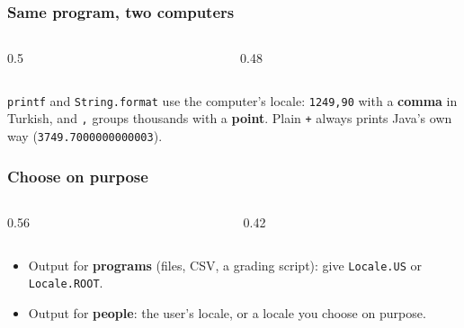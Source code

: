 \documentclass[aspectratio=169,10pt,compress]{beamer}
\begin{document}




\begin{frame}[t,fragile] \frametitle{Same program, two computers}
  \begin{columns}[T]
    \begin{column}{0.5\textwidth}
    \end{column}
    \begin{column}{0.48\textwidth}
    \end{column}
  \end{columns}
  \vspace{0.1em}
  \small \texttt{printf} and \texttt{String.format} use the computer's locale: \texttt{1249,90} with a
  \textbf{comma} in Turkish, and \texttt{,} groups thousands with a \textbf{point}.
  Plain \texttt{+} always prints Java's own way (\texttt{3749.7000000000003}).
\end{frame}




\begin{frame}[t,fragile] \frametitle{Choose on purpose}
  \begin{columns}[T]
    \begin{column}{0.56\textwidth}
    \end{column}
    \begin{column}{0.42\textwidth}
    \end{column}
  \end{columns}
  \vspace{0.2em}
  \begin{itemize}\small
    \item Output for \textbf{programs} (files, CSV, a grading script): give \texttt{Locale.US} or \texttt{Locale.ROOT}.
    \item Output for \textbf{people}: the user's locale, or a locale you choose on purpose.
  \end{itemize}
\end{frame}
\end{document}
